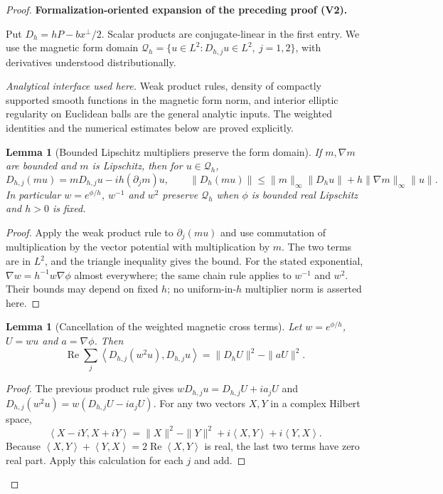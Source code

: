 \documentclass[11pt]{article}
\newtheorem{lemma}[theorem]{Lemma}
\newcommand{\formalisationparentid}{X}
\newenvironment{formalisationaddition}[1]{\par\medskip\begingroup\color{blue}\def\formalisationparentid{#1}\setcounter{formalizationsublemma}{0}\let\lemma\formalizationsublemma\let\endlemma\endformalizationsublemma
  \def\Eo{\mathcal E_h^\circ}\def\EE{\mathcal E_h}\def\phio{\phi_h^\circ}\def\phih{\phi_h}\def\Ho{H_h^{\rm atom}(v^\circ)}\def\Ha{H_h^{\rm atom}}\def\HL{H_h^{L}}\def\Dh{D_h}\def\Log{\operatorname{Log}}\def\ellh{\ell_h}\def\Gp{G_{p,h}}\def\Ast{A_{*,h}}\def\ahat{\widehat{\mathfrak a}_h}\def\ah{\mathfrak a_h}\def\rh{\widehat\rho_h}\def\deltah{\widehat\delta_h}\def\oldref##1{\textup{(##1)}}\def\interface##1{\par\noindent\textit{Analytical interface used here.} ##1\par}\def\finish{\par\noindent\textit{Conclusion of the formalization-oriented expansion.} }\par\noindent\textbf{Formalization-oriented expansion of the preceding proof (V2).}\par\smallskip
}{\par\endgroup\medskip
}
\newcommand{\ip}[2]{\left\langle #1,#2\right\rangle}
\newcommand{\Rea}{\operatorname{Re}}
\begin{document}
\begin{proof}
\begin{formalisationaddition}{L2.5}
Put $D_h=hP-bx^\perp/2$. Scalar products are conjugate-linear in the first
entry. We use the magnetic form domain
$\mathcal Q_h=\{u\in L^2:D_{h,j}u\in L^2,\ j=1,2\}$, with derivatives
understood distributionally.

\interface{Weak product rules, density of compactly supported smooth
functions in the magnetic form norm, and interior elliptic regularity on
Euclidean balls are the general analytic inputs. The weighted identities
and the numerical estimates below are proved explicitly.}

\begin{lemma}[Bounded Lipschitz multipliers preserve the form domain]\label{sublemma:L2-5-multiplier-domain}
If $m,\nabla m$ are bounded and $m$ is Lipschitz, then for $u\in\mathcal Q_h$,
\[
 D_{h,j}(mu)=mD_{h,j}u-ih(\partial_jm)u,\qquad
 \|D_h(mu)\|\le\|m\|_\infty\|D_hu\|+h\|\nabla m\|_\infty\|u\|.
\]
In particular $w=e^{\phi/h}$, $w^{-1}$ and $w^2$ preserve $\mathcal Q_h$
when $\phi$ is bounded real Lipschitz and $h>0$ is fixed.
\end{lemma}
\begin{proof}
Apply the weak product rule to $\partial_j(mu)$ and use commutation of
multiplication by the vector potential with multiplication by $m$.
The two terms are in $L^2$, and the triangle inequality gives the bound.
For the stated exponential, $\nabla w=h^{-1}w\nabla\phi$ almost everywhere;
the same chain rule applies to $w^{-1}$ and $w^2$. Their bounds may depend
on fixed $h$; no uniform-in-$h$ multiplier norm is asserted here.
\end{proof}

\begin{lemma}[Cancellation of the weighted magnetic cross terms]\label{sublemma:L2-5-cross-term-cancellation}
Let $w=e^{\phi/h}$, $U=wu$ and $a=\nabla\phi$. Then
\[
 \Rea\sum_j\ip{D_{h,j}(w^2u)}{D_{h,j}u}
      =\|D_hU\|^2-\|aU\|^2.
\]
\end{lemma}
\begin{proof}
The previous product rule gives
$wD_{h,j}u=D_{h,j}U+ia_jU$ and
$D_{h,j}(w^2u)=w(D_{h,j}U-ia_jU)$.
For any two vectors $X,Y$ in a complex Hilbert space,
\[
 \ip{X-iY}{X+iY}
 =\|X\|^2-\|Y\|^2+i\ip XY+i\ip YX.
\]
Because $\ip XY+\ip YX=2\Rea\ip XY$ is real, the last two terms have
zero real part. Apply this calculation for each $j$ and add.
\end{proof}


\end{formalisationaddition}
\end{proof}
\end{document}
